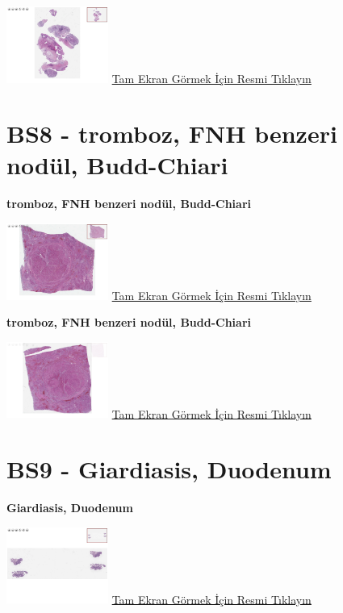 \documentclass[
  letterpaper,
  DIV=11,
  numbers=noendperiod]{scrreprt}
\begin{document}
\href{https://images.patolojiatlasi.com/BS7/HE.html}{\includegraphics[width=0.25\textwidth,height=\textheight]{./screenshots/BS7-HE_screenshot.png}}
\href{https://images.patolojiatlasi.com/BS7/HE.html}{Tam Ekran Görmek
İçin Resmi Tıklayın}

\hypertarget{sec-BS8}{%
\section{BS8 - tromboz, FNH benzeri nodül, Budd-Chiari}\label{sec-BS8}}

\textbf{tromboz, FNH benzeri nodül, Budd-Chiari}

\href{https://images.patolojiatlasi.com/BS8/HE1.html}{\includegraphics[width=0.25\textwidth,height=\textheight]{./screenshots/BS8-HE1_screenshot.png}}
\href{https://images.patolojiatlasi.com/BS8/HE1.html}{Tam Ekran Görmek
İçin Resmi Tıklayın}

\textbf{tromboz, FNH benzeri nodül, Budd-Chiari}

\href{https://images.patolojiatlasi.com/BS8/HE2.html}{\includegraphics[width=0.25\textwidth,height=\textheight]{./screenshots/BS8-HE2_screenshot.png}}
\href{https://images.patolojiatlasi.com/BS8/HE2.html}{Tam Ekran Görmek
İçin Resmi Tıklayın}

\hypertarget{sec-BS9}{%
\section{BS9 - Giardiasis, Duodenum}\label{sec-BS9}}

\textbf{Giardiasis, Duodenum}

\href{https://images.patolojiatlasi.com/BS9/HE1.html}{\includegraphics[width=0.25\textwidth,height=\textheight]{./screenshots/BS9-HE1_screenshot.png}}
\href{https://images.patolojiatlasi.com/BS9/HE1.html}{Tam Ekran Görmek
İçin Resmi Tıklayın}
\end{document}
